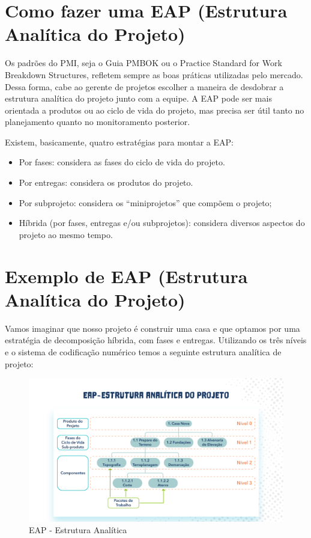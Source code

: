 \section{Como fazer uma EAP (Estrutura Analítica do Projeto)}

Os padrões do PMI, seja o Guia PMBOK ou o Practice Standard for Work Breakdown Structures, refletem sempre as boas práticas utilizadas pelo mercado. Dessa forma, cabe ao gerente de projetos escolher a maneira de desdobrar a estrutura analítica do projeto junto com a equipe. A EAP pode ser mais orientada a produtos ou ao ciclo de vida do projeto, mas precisa ser útil tanto no planejamento quanto no monitoramento posterior.

Existem, basicamente, quatro estratégias para montar a EAP:

\begin{itemize}
\item Por fases: considera as fases do ciclo de vida do projeto.
\item Por entregas: considera os produtos do projeto.
\item Por subprojeto: considera os “miniprojetos” que compõem o projeto;
\item Híbrida (por fases, entregas e/ou subprojetos): considera diversos aspectos do projeto ao mesmo tempo.
\end{itemize}

\section{Exemplo de EAP (Estrutura Analítica do Projeto)}

Vamos imaginar que nosso projeto é construir uma casa e que optamos por uma estratégia de decomposição híbrida, com fases e entregas. Utilizando os três níveis e o sistema de codificação numérico temos a seguinte estrutura analítica de projeto:

\begin{figure}[H]
    \centering
    \includegraphics[width=0.7\linewidth]{dados/figuras/eap}
    \caption{EAP - Estrutura Analítica}
    \label{fig:eap}
\end{figure}

